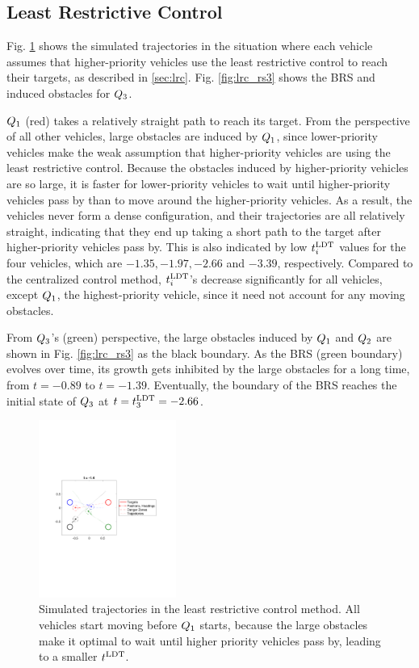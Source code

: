 \subsection{Least Restrictive Control}
Fig. \ref{fig:lrc_traj} shows the simulated trajectories in the situation where each vehicle assumes that higher-priority vehicles use the least restrictive control to reach their targets, as described in \ref{sec:lrc}. Fig. \ref{fig:lrc_rs3} shows the BRS and induced obstacles for $Q_3$.

$Q_1$ (red) takes a relatively straight path to reach its target. From the perspective of all other vehicles, large obstacles are induced by $Q_1$, since lower-priority vehicles make the weak assumption that higher-priority vehicles are using the least restrictive control. Because the obstacles induced by higher-priority vehicles are so large, it is faster for lower-priority vehicles to wait until higher-priority vehicles pass by than to move around the higher-priority vehicles. As a result, the vehicles never form a dense configuration, and their trajectories are all relatively straight, indicating that they end up taking a short path to the target after higher-priority vehicles pass by. This is also indicated by low $t^\text{LDT}_i$ values for the four vehicles, which are $-1.35, -1.97, -2.66$ and $-3.39$, respectively. Compared to the centralized control method, $t^\text{LDT}_i$'s decrease significantly for all vehicles, except $Q_1$, the highest-priority vehicle, since it need not account for any moving obstacles. 

From $Q_3$'s (green) perspective, the large obstacles induced by $Q_1$ and $Q_2$ are shown in Fig. \ref{fig:lrc_rs3} as the black boundary. As the BRS (green boundary) evolves over time, its growth gets inhibited by the large obstacles for a long time, from $t=-0.89$ to $t=-1.39$. Eventually, the boundary of the BRS reaches the initial state of $Q_3$ at $t = t^\text{LDT}_3 = -2.66$.

\begin{figure}[H]
  \centering
  \includegraphics[width=0.40\textwidth]{"fig/lrc_traj"}
  \caption{Simulated trajectories in the least restrictive control method. All vehicles start moving before $Q_1$ starts, because the large obstacles make it optimal to wait until higher priority vehicles pass by, leading to a smaller $t^\text{LDT}$. }
  \label{fig:lrc_traj}
\end{figure}

